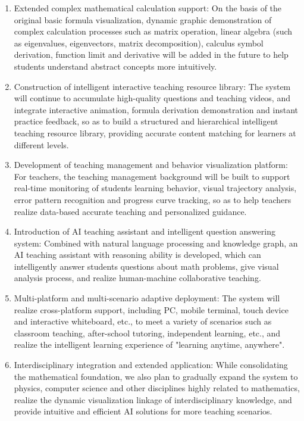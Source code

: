 \documentclass[
]{article}
\begin{document}
\begin{enumerate}
\def\labelenumi{\arabic{enumi}.}
\item
  Extended complex mathematical calculation support: On the basis of the
  original basic formula visualization, dynamic graphic demonstration of
  complex calculation processes such as matrix operation, linear algebra
  (such as eigenvalues, eigenvectors, matrix decomposition), calculus
  symbol derivation, function limit and derivative will be added in the
  future to help students understand abstract concepts more intuitively.
\item
  Construction of intelligent interactive teaching resource library: The
  system will continue to accumulate high-quality questions and teaching
  videos, and integrate interactive animation, formula derivation
  demonstration and instant practice feedback, so as to build a
  structured and hierarchical intelligent teaching resource library,
  providing accurate content matching for learners at different levels.
\item
  Development of teaching management and behavior visualization
  platform: For teachers, the teaching management background will be
  built to support real-time monitoring of students\textquotesingle{}
  learning behavior, visual trajectory analysis, error pattern
  recognition and progress curve tracking, so as to help teachers
  realize data-based accurate teaching and personalized guidance.
\item
  Introduction of AI teaching assistant and intelligent question
  answering system: Combined with natural language processing and
  knowledge graph, an AI teaching assistant with reasoning ability is
  developed, which can intelligently answer students\textquotesingle{}
  questions about math problems, give visual analysis process, and
  realize human-machine collaborative teaching.
\item
  Multi-platform and multi-scenario adaptive deployment: The system will
  realize cross-platform support, including PC, mobile terminal, touch
  device and interactive whiteboard, etc., to meet a variety of
  scenarios such as classroom teaching, after-school tutoring,
  independent learning, etc., and realize the intelligent learning
  experience of "learning anytime, anywhere".
\item
  Interdisciplinary integration and extended application: While
  consolidating the mathematical foundation, we also plan to gradually
  expand the system to physics, computer science and other disciplines
  highly related to mathematics, realize the dynamic visualization
  linkage of interdisciplinary knowledge, and provide intuitive and
  efficient AI solutions for more teaching scenarios.
\end{enumerate}
\end{document}
